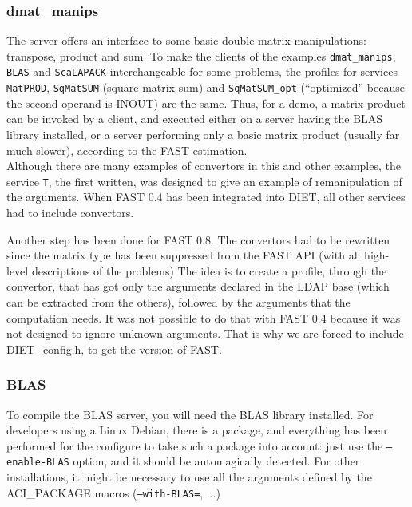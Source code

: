 \subsubsection{dmat\_manips}

The server offers an interface to some basic double matrix manipulations:
transpose, product and sum. To make the clients of the examples
\texttt{dmat\_manips}, \texttt{BLAS} and \texttt{ScaLAPACK} interchangeable for
some problems, the profiles for services \texttt{MatPROD}, \texttt{SqMatSUM}
(square matrix sum) and \texttt{SqMatSUM\_opt} (``optimized'' because the second
operand is INOUT) are the same. Thus, for a demo, a matrix product can be
invoked by a client, and executed either on a server having the BLAS library
installed, or a server performing only a basic matrix product (usually far much
slower), according to the FAST estimation.
\\

Although there are many examples of convertors in this and other examples, the
service \texttt{T}, the first written, was designed to give an example of
remanipulation of the arguments. When FAST 0.4 has been integrated into DIET,
all other services had to include convertors.

Another step has been done for FAST 0.8. The convertors had to be rewritten
since the matrix type has been suppressed from the FAST API (with all high-level
descriptions of the problems) The idea is to create a profile, through the
convertor, that has got only the arguments declared in the LDAP base (which can
be extracted from the others), followed by the arguments that the computation
needs. It was not possible to do that with FAST 0.4 because it was not designed
to ignore unknown arguments. That is why we are forced to include
\textsf{DIET\_config.h}, to get the version of FAST.
\\



\subsubsection{BLAS}

To compile the BLAS server, you will need the BLAS library installed. For
developers using a Linux Debian, there is a package, and everything has been
performed for the configure to take such a package into account: just use the
\texttt{--enable-BLAS} option, and it should be automagically detected. For
other installations, it might be necessary to use all the arguments defined by
the ACI\_PACKAGE macros (\texttt{--with-BLAS=}, ...)

